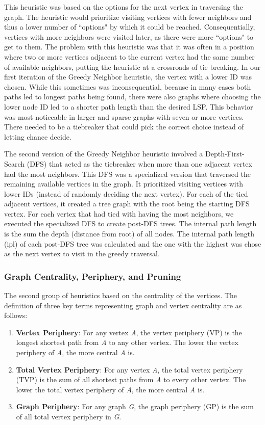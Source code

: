 \documentclass[twocolumn,showpacs,%
  nofootinbib,aps,superscriptaddress,%
  eqsecnum,prd,notitlepage,showkeys,11pt]{article}
\begin{document}
This heuristic was based on the options for the next vertex in traversing the graph. The heuristic would prioritize visiting vertices with fewer neighbors and thus a lower number of ``options" by which it could be reached. Consequentially, vertices with more neighbors were visited later, as there were more ``options" to get to them. The problem with this heuristic was that it was often in a position where two or more vertices adjacent to the current vertex had the same number of available neighbors, putting the heuristic at a crossroads of tie breaking. In our first iteration of the Greedy Neighbor heuristic, the vertex with a lower ID was chosen. While this sometimes was inconsequential, because in many cases both paths led to longest paths being found, there were also graphs where choosing the lower node ID led to a shorter path length than the desired LSP. This behavior was most noticeable in larger and sparse graphs with seven or more vertices. There needed to be a tiebreaker that could pick the correct choice instead of letting chance decide. 

The second version of the Greedy Neighbor heuristic involved a Depth-First-Search (DFS) that acted as the tiebreaker when more than one adjacent vertex had the most neighbors. This DFS was a specialized version that traversed the remaining available vertices in the graph. It prioritized visiting vertices with lower IDs (instead of randomly deciding the next vertex). For each of the tied adjacent vertices, it created a tree graph with the root being the starting DFS vertex. For each vertex that had tied with having the most neighbors, we executed the specialized DFS to create post-DFS trees. The internal path length is the sum the depth (distance from root) of all nodes. The internal path length (ipl) of each post-DFS tree was calculated and the one with the highest was chose as the next vertex to visit in the greedy traversal. 

\subsubsection{Graph Centrality, Periphery, and Pruning}
The second group of heuristics based on the centrality of the vertices. The definition of three key terms representing graph and vertex centrality are as follows: 

\begin{enumerate}
    \item \textbf{Vertex Periphery}: For any vertex \emph{A}, the vertex periphery (VP) is the longest shortest path from \emph{A} to any other vertex. The lower the vertex periphery of \emph{A}, the more central \emph{A} is.
    \item \textbf{Total Vertex Periphery}:  For any vertex \emph{A}, the total vertex periphery (TVP) is the sum of all shortest paths from \emph{A} to every other vertex. The lower the total vertex periphery of \emph{A}, the more central \emph{A} is.
    \item \textbf{Graph Periphery}: For any graph \emph{G}, the graph periphery (GP) is the sum of all total vertex periphery in \emph{G}.
\end{enumerate}
\end{document}
